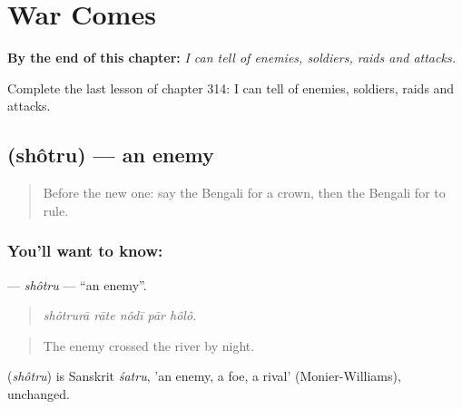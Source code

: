 
\chapter{War Comes}
\label{ch:bn-war-comes}

\begin{chapteropening}
\textbf{By the end of this chapter:} \emph{I can tell of enemies, soldiers, raids and attacks.}

Complete the last lesson of chapter 314: I can tell of enemies, soldiers, raids and attacks.
\end{chapteropening}

\section[\texorpdfstring{\bn{শত্রু} (shôtru)}{শত্রু (shôtru)}]{ (shôtru) — an enemy}

\label{lesson:BN-C314-shotru}



\begin{quote}
Before the new one: say the Bengali for a crown, then the Bengali for to rule.
\end{quote}

\subsection*{You'll want to know: }
\textbf{} — \emph{shôtru} — \textquotedblleft{}an enemy\textquotedblright{}.

\begin{quote}
    
\end{quote}

\begin{quote}
\emph{shôtrurā rāte nôdī pār hôlô.}
\end{quote}

\begin{quote}
The enemy crossed the river by night.
\end{quote}

\begin{cousinweb}
\textbf{} (\emph{shôtru}) is Sanskrit \emph{śatru}, 'an enemy, a foe, a rival' (Monier-Williams), unchanged.
\end{cousinweb}

